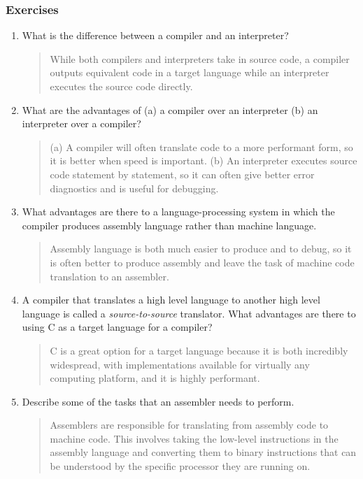 \documentclass[titlepage]{article}
\begin{document}
\subsubsection*{Exercises}
\begin{enumerate}
    \item What is the difference between a compiler and an interpreter?
          \begin{quote}
              While both compilers and interpreters take in source code, a compiler outputs equivalent code in a target language while an interpreter executes the source code directly.
          \end{quote}
    \item What are the advantages of (a) a compiler over an interpreter (b) an interpreter over a compiler?
          \begin{quote}
              (a) A compiler will often translate code to a more performant form, so it is better when speed is important. (b) An interpreter executes source code statement by statement, so it can often give better error diagnostics and is useful for debugging.
          \end{quote}
    \item What advantages are there to a language-processing system in which the compiler produces assembly language rather than machine language.
          \begin{quote}
              Assembly language is both much easier to produce and to debug, so it is often better to produce assembly and leave the task of machine code translation to an assembler.
          \end{quote}
    \item A compiler that translates a high level language to another high level language is called a \textit{source-to-source} translator. What advantages are there to using C as a target language for a compiler?
          \begin{quote}
              C is a great option for a target language because it is both incredibly widespread, with implementations available for virtually any computing platform, and it is highly performant.
          \end{quote}
    \item Describe some of the tasks that an assembler needs to perform.
          \begin{quote}
              Assemblers are responsible for translating from assembly code to machine code. This involves taking the low-level instructions in the assembly language and converting them to binary instructions that can be understood by the specific processor they are running on.
          \end{quote}
\end{enumerate}
\end{document}
